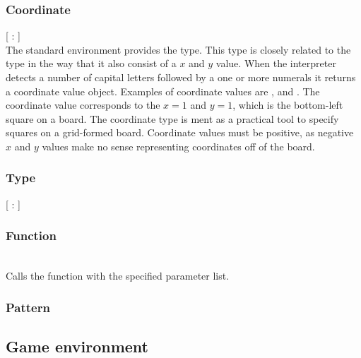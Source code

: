 \subsubsection{Coordinate}
\begin{dlist}
  \item {}[ : ]\\
    The standard environment provides the  type. This type
    is closely related to the  type in the way that it also consist of
    a $x$ and $y$ value. When the interpreter detects a number of
    capital letters followed by a one or more numerals it returns a coordinate
    value object. Examples of coordinate values are , 
    and . The coordinate value  corresponds to the
    $x = 1$ and $y = 1$, which is the bottom-left square on a board.
    The coordinate type is ment as a practical tool to specify squares on a
    grid-formed board. Coordinate values must be positive, as negative $x$ and
    $y$ values make no sense representing coordinates off of the board.
\end{dlist}

\subsubsection{Type}
\begin{dlist}
  \item {}[ : ]\\
\end{dlist}

\subsubsection{Function}
\begin{dlist}
  \item {}\\
    Calls the function with the specified parameter list. 
\end{dlist}

\subsubsection{Pattern}

\subsection{Game environment}
\label{sec:gameenvironment}

